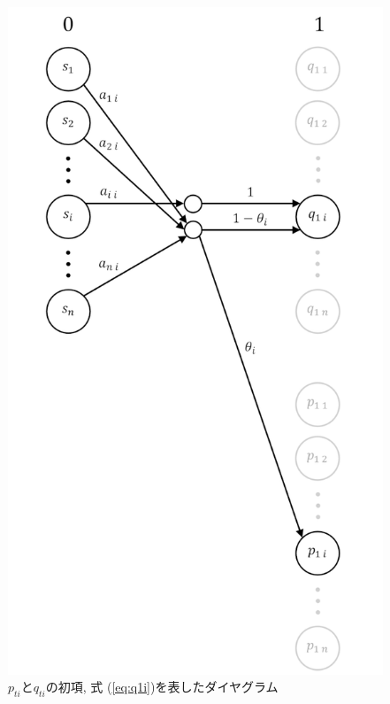 \begin{figure}[H]
    \begin{center}
        \includegraphics[width=0.7\linewidth]{figs/pq_0.png}
        \caption{$p_{t i}$と$q_{t i}$の初項, 式 (\ref{eq:q1i})を表したダイヤグラム}
        \label{fig:pqt}
    \end{center}
\end{figure}

